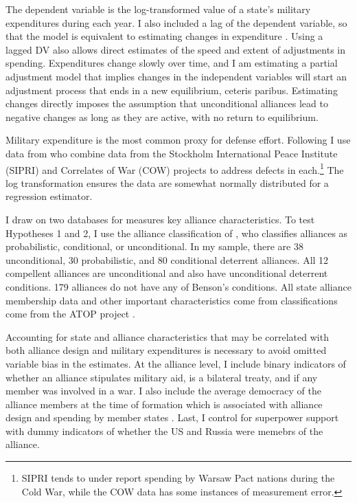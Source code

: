 \documentclass[12pt]{article}
\begin{document}
The dependent variable is the log-transformed value of a state's military expenditures during each year. I also included a lag of the dependent variable, so that the model is equivalent to estimating changes in expenditure \cite{DeBoefKeele2008}. Using a lagged DV also allows direct estimates of the speed and extent of adjustments in spending. Expenditures change slowly over time, and I am estimating a partial adjustment model that implies changes in the independent variables will start an adjustment process that ends in a new equilibrium, ceteris paribus. Estimating changes directly imposes the assumption that unconditional alliances lead to negative changes as long as they are active, with no return to equilibrium. 

Military expenditure is the most common proxy for defense effort. Following \citet{DigiuseppePoast2016} I use data from \citet{Nordhausetal2012} who combine data from the Stockholm International Peace Institute (SIPRI) and Correlates of War (COW) projects to address defects in each.\footnote{SIPRI tends to under report spending by Warsaw Pact nations during the Cold War, while the COW data has some instances of measurement error.} The log transformation ensures the data are somewhat normally distributed for a regression estimator. 

I draw on two databases for measures key alliance characteristics. To test Hypotheses 1 and 2, I use the alliance classification of \citet{Benson2012}, who classifies alliances as probabilistic, conditional, or unconditional. In my sample, there are 38 unconditional, 30 probabilistic, and 80 conditional deterrent alliances. All 12 compellent alliances are unconditional and also have unconditional deterrent conditions. 179 alliances do not have any of Benson's conditions. All state alliance membership data and other important characteristics come from classifications come from the ATOP project \citep{Leedsetal2002}. 

Accounting for state and alliance characteristics that may be correlated with both alliance design and military expenditures is necessary to avoid omitted variable bias in the estimates. At the alliance level, I include binary indicators of whether an alliance stipulates military aid, is a bilateral treaty, and if any member was involved in a war. I also include the average democracy of the alliance members at the time of formation which is associated with alliance design \citep{Chibaetal2015} and spending by member states \citep{DigiuseppePoast2016}. Last, I control for superpower support with dummy indicators of whether the US and Russia were memebrs of the alliance.  
\end{document}
